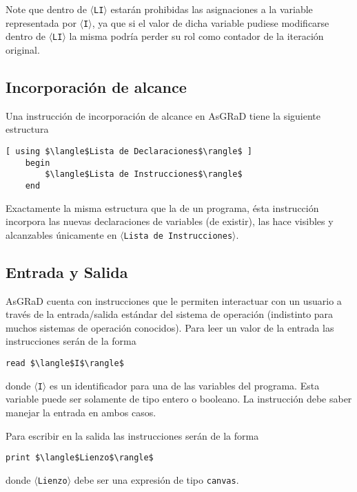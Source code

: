 \documentclass[letterpaper,11pt]{article}
\newcommand{\asgrad}{AsGRaD\xspace}
\newcommand{\general}[1]{$\langle$\texttt{#1}$\rangle$}
\begin{document}
Note que dentro de \general{LI} estarán prohibidas las asignaciones a la variable representada por \general{I}, ya que si el valor de dicha variable pudiese modificarse dentro de \general{LI} la misma podría perder su rol como contador de la iteración original.

\subsection{Incorporación de alcance}

Una instrucción de incorporación de alcance en \asgrad tiene
la siguiente estructura

\begin{lstlisting}[mathescape=true]
    [ using $\langle$Lista de Declaraciones$\rangle$ ]
    begin
        $\langle$Lista de Instrucciones$\rangle$
    end
\end{lstlisting}

Exactamente la misma estructura que la de un programa, ésta instrucción incorpora las nuevas declaraciones de variables (de existir), las hace visibles y alcanzables únicamente en \general{Lista de Instrucciones}.

\subsection{Entrada y Salida}

\asgrad cuenta con instrucciones que le permiten interactuar con un
usuario a través de la entrada/salida estándar del sistema de operación (indistinto para muchos sistemas de operación conocidos). Para leer un valor de la entrada las instrucciones serán de la forma

\begin{lstlisting}[mathescape=true]
    read $\langle$I$\rangle$
\end{lstlisting}

donde \general{I} es un identificador para una de las variables del programa. Esta variable puede ser solamente de tipo entero o booleano. La instrucción debe saber manejar la entrada en ambos casos.

Para escribir en la salida las instrucciones serán de la forma

\begin{lstlisting}[mathescape=true]
    print $\langle$Lienzo$\rangle$
\end{lstlisting}

donde \general{Lienzo} debe ser una expresión de tipo \texttt{canvas}.
\end{document}
